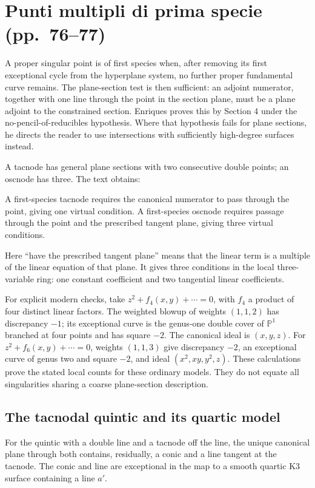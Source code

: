 \section[Punti multipli di prima specie]{Punti multipli di prima specie (pp.~76--77)}\label{commentary-III-7}

A proper singular point is of first species when, after removing its first exceptional cycle from the hyperplane system, no further proper fundamental curve remains. The plane-section test is then sufficient: an adjoint numerator, together with one line through the point in the section plane, must be a plane adjoint to the constrained section. Enriques proves this by Section 4 under the no-pencil-of-reducibles hypothesis. Where that hypothesis fails for plane sections, he directs the reader to use intersections with sufficiently high-degree surfaces instead.

A tacnode has general plane sections with two consecutive double points; an oscnode has three. The text obtains:

A first-species tacnode requires the canonical numerator to pass through the point, giving one virtual condition. A first-species oscnode requires passage through the point and the prescribed tangent plane, giving three virtual conditions.

Here ``have the prescribed tangent plane'' means that the linear term is a multiple of the linear equation of that plane. It gives three conditions in the local three-variable ring: one constant coefficient and two tangential linear coefficients.

For explicit modern checks, take \(z^2+f_4(x,y)+\cdots=0\), with \(f_4\) a product of four distinct linear factors. The weighted blowup of weights \((1,1,2)\) has discrepancy \(-1\); its exceptional curve is the genus-one double cover of \(\mathbb{P}^1\) branched at four points and has square \(-2\). The canonical ideal is \((x,y,z)\). For \(z^2+f_6(x,y)+\cdots=0\), weights \((1,1,3)\) give discrepancy \(-2\), an exceptional curve of genus two and square \(-2\), and ideal \((x^2,xy,y^2,z)\). These calculations prove the stated local counts for these ordinary models. They do not equate all singularities sharing a coarse plane-section description.

\subsection{The tacnodal quintic and its quartic model}

For the quintic with a double line and a tacnode off the line, the unique canonical plane through both contains, residually, a conic and a line tangent at the tacnode. The conic and line are exceptional in the map to a smooth quartic K3 surface containing a line \(a'\).

